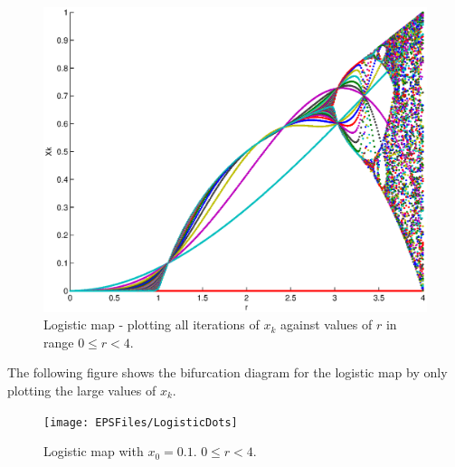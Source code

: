 \documentclass[a4wide, 10pt]{article}
\begin{document}
\begin{figure}[H]

    \centering

    \includegraphics[scale=0.3]{EPSFiles/LogisticAllXk}

    \caption{Logistic map - plotting all iterations of $x_{k}$ against values of $r$ in range $0 \leq r < 4$.}

    \label{LogisticAllXk}

\end{figure}

The following figure shows the bifurcation diagram for the logistic map by only plotting the large values of $x_{k}$.

\begin{figure}[H]

    \centering

    \texttt{[image: EPSFiles/LogisticDots]}

    \caption{Logistic map with $x_{0} = 0.1$. $0 \leq r < 4$.}

    \label{LogisticDots}

\end{figure} 
\end{document}
